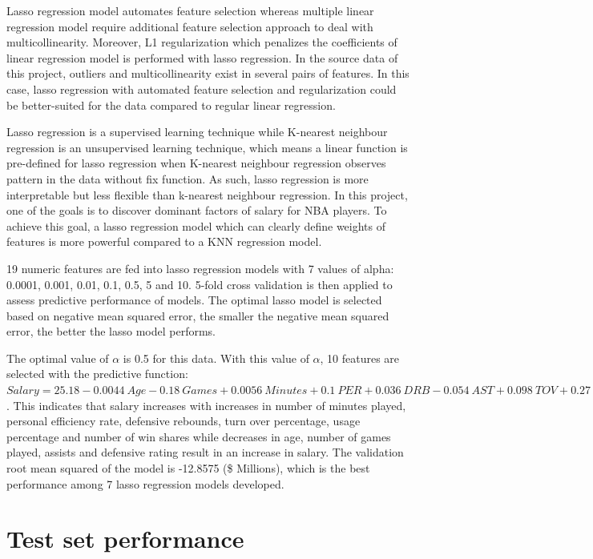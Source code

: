 \documentclass[letterpaper,12pt,twoside,]{pinp}
\begin{document}
Lasso regression model automates feature selection whereas multiple
linear regression model require additional feature selection approach to
deal with multicollinearity. Moreover, L1 regularization which penalizes
the coefficients of linear regression model is performed with lasso
regression. In the source data of this project, outliers and
multicollinearity exist in several pairs of features. In this case,
lasso regression with automated feature selection and regularization
could be better-suited for the data compared to regular linear
regression.

Lasso regression is a supervised learning technique while K-nearest
neighbour regression is an unsupervised learning technique, which means
a linear function is pre-defined for lasso regression when K-nearest
neighbour regression observes pattern in the data without fix function.
As such, lasso regression is more interpretable but less flexible than
k-nearest neighbour regression. In this project, one of the goals is to
discover dominant factors of salary for NBA players. To achieve this
goal, a lasso regression model which can clearly define weights of
features is more powerful compared to a KNN regression model.

19 numeric features are fed into lasso regression models with 7 values
of alpha: 0.0001, 0.001, 0.01, 0.1, 0.5, 5 and 10. 5-fold cross
validation is then applied to assess predictive performance of models.
The optimal lasso model is selected based on negative mean squared
error, the smaller the negative mean squared error, the better the lasso
model performs.

The optimal value of \(\alpha\) is 0.5 for this data. With this value of
\(\alpha\), 10 features are selected with the predictive function:
\(Salary = 25.18-0.0044~Age-0.18~Games+0.0056~Minutes+0.1~PER+0.036~DRB-0.054~AST+0.098~TOV+0.27~USG-0.23~RDtg+0.17～WS\).
This indicates that salary increases with increases in number of minutes
played, personal efficiency rate, defensive rebounds, turn over
percentage, usage percentage and number of win shares while decreases in
age, number of games played, assists and defensive rating result in an
increase in salary. The validation root mean squared of the model is
-12.8575 (\$ Millions), which is the best performance among 7 lasso
regression models developed.

\hypertarget{test-set-performance}{%
\section{Test set performance}\label{test-set-performance}}
\end{document}
